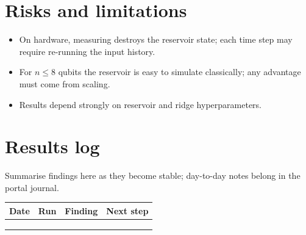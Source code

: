 \documentclass[11pt,a4paper]{article}
\begin{document}
\section{Risks and limitations}
\begin{itemize}
  \item On hardware, measuring destroys the reservoir state; each time step may require re-running the input history.
  \item For $n\le8$ qubits the reservoir is easy to simulate classically; any advantage must come from scaling.
  \item Results depend strongly on reservoir and ridge hyperparameters.
\end{itemize}

\section{Results log}
\label{sec:log}
Summarise findings here as they become stable; day-to-day notes belong in the portal journal.

\begin{table}[h]
\centering\small
\begin{tabularx}{\linewidth}{@{}l l >{\raggedright}X >{\raggedright\arraybackslash}X@{}}
\toprule
Date & Run & Finding & Next step \\
\midrule
 & & & \\
 & & & \\
 & & & \\
\bottomrule
\end{tabularx}
\end{table}



\end{document}

